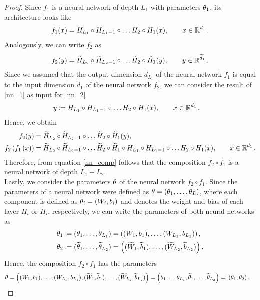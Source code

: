 \begin{proof}
Since $f_1$ is a neural network of depth $L_1$ with parameters $\theta_1$, its architecture looks like
\begin{align}\label{nn_1}
f_1 (x) = H_{L_1} \circ H_{L_1-1} \circ \ldots H_{2} \circ H_1 (x),\qquad x \in \operatorname{\mathbb{R}}^{d_1}.
\end{align}
Analogously, we can write $f_2$ as
\begin{align}\label{nn_2}
f_2 (y) = \widetilde{H}_{L_2} \circ \widetilde{H}_{L_2-1} \circ \ldots \widetilde{H}_{2} \circ \widetilde{H}_1 (y), \qquad y \in \operatorname{\mathbb{R}}^{\widetilde{d}_1}.
\end{align}
Since we assumed that the output dimension $d_{L_1}$ of the neural network $f_1$ is equal to the input dimension $\tilde{d}_1$ of the neural network $f_2$, we can consider the result of \eqref{nn_1} as input for \eqref{nn_2}
\begin{align*}
y &\coloneqq H_{L_1} \circ H_{L_1-1} \circ \ldots H_{2} \circ H_1 (x), \qquad x \in \operatorname{\mathbb{R}}^{d_1}.
\end{align*}
Hence, we obtain
\begin{align}\label{nn_comp}
f_2 (y) &= \widetilde{H}_{L_2} \circ \widetilde{H}_{L_2-1} \circ \ldots \widetilde{H}_{2} \circ \widetilde{H}_1 (y),\nonumber\\
f_2\left(f_1\left(x\right)\right)  &= \widetilde{H}_{L_2} \circ \widetilde{H}_{L_2-1} \circ \ldots \widetilde{H}_{2} \circ \widetilde{H}_1 \circ H_{L_1} \circ H_{L_1-1} \circ \ldots H_{2} \circ H_1 (x), \qquad x \in \operatorname{\mathbb{R}}^{d_1}.
\end{align}
Therefore, from equation \eqref{nn_comp} follows that the composition $f_2 \circ f_1$ is a neural network of depth $L_1 + L_2$.\\
Lastly, we consider the parameters $\theta$ of the neural network $f_2 \circ f_1$. Since the parameters of a neural network were defined as $\theta = (\theta_1,\ldots, \theta_L)$, where each component is defined as $\theta_i = (W_i, b_i)$ and denotes the weight and bias of each layer $H_i$ or $\tilde{H}_i$, respectively, we can write the parameters of both neural networks as
\begin{align*}
\theta_1 &\coloneqq (\theta_1, \ldots, \theta_{L_1}) = \left((W_1, b_1),\ldots, (W_{L_1}, b_{L_1}) \right),\\
\theta_2 &\coloneqq (\widetilde{\theta}_1, \ldots, \widetilde{\theta}_{L_2}) = \left((\widetilde{W}_1, \widetilde{b}_1),\ldots, (\widetilde{W}_{L_2}, \widetilde{b}_{L_2}) \right).
\end{align*}
Hence, the composition $f_2\circ f_1$ has the parameters
\begin{align*}
\theta  &= \left((W_1, b_1),\ldots, (W_{L_1}, b_{L_1}), (\widetilde{W}_1, \widetilde{b}_1),\ldots, (\widetilde{W}_{L_2}, \widetilde{b}_{L_2})  \right) = \left(\theta_1,\ldots \theta_{L_1}, \widetilde{\theta}_1, \ldots, \widetilde{\theta}_{L_2} \right) \eqqcolon \left(\theta_1,\theta_2 \right).
\end{align*}
\end{proof}



